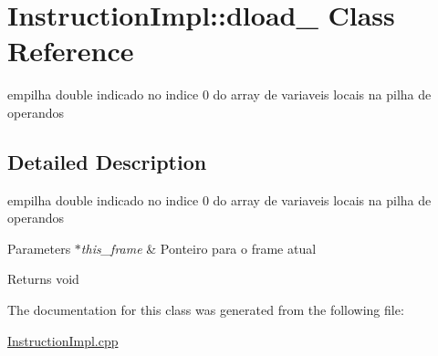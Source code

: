 \hypertarget{class_instruction_impl_1_1dload__0}{}\section{Instruction\+Impl\+:\+:dload\+\_ Class Reference}
\label{class_instruction_impl_1_1dload__0}


empilha double indicado no indice 0 do array de variaveis locais na pilha de operandos  




\subsection{Detailed Description}
empilha double indicado no indice 0 do array de variaveis locais na pilha de operandos 


\begin{DoxyParams}{Parameters}
{\em $\ast$this\+\_\+frame} & Ponteiro para o frame atual \\
\hline
\end{DoxyParams}
\begin{DoxyReturn}{Returns}
void 
\end{DoxyReturn}


The documentation for this class was generated from the following file\+:\begin{DoxyCompactItemize}
\item 
\hyperlink{_instruction_impl_8cpp}{Instruction\+Impl.\+cpp}\end{DoxyCompactItemize}
